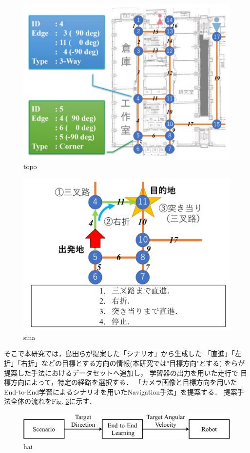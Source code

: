 \begin{figure}[H]
    \centering
    \includegraphics[width = 13cm]{./figs/topo.png}
    \caption{topo\cite{razikon}}
    \label{fig::topo}
\end{figure}
\begin{figure}[H]
    \centering
    \includegraphics[width = 13cm]{./figs/sina.png}
    \caption{sina\cite{razikon}}
    \label{fig::sina}
\end{figure}

そこで本研究では，島田らが提案した「シナリオ」から生成した
「直進」「左折」「右折」などの目標とする方向の情報(本研究では"目標方向"とする)
を\cite{okada}らが提案した手法におけるデータセットへ追加し，
学習器の出力を用いた走行で
目標方向によって，特定の経路を選択する．
「カメラ画像と目標方向を用いたEnd-to-End学習によるシナリオを用いたNavigation手法」を提案する．
提案手法全体の流れをFig. \ref{fig::haikei_zentai}に示す．
\begin{figure}[H]
    \centering
    \includegraphics[width = 13cm]{./figs/haikei_zentai.pdf}
    \caption{hai}
    \label{fig::haikei_zentai}
\end{figure}

